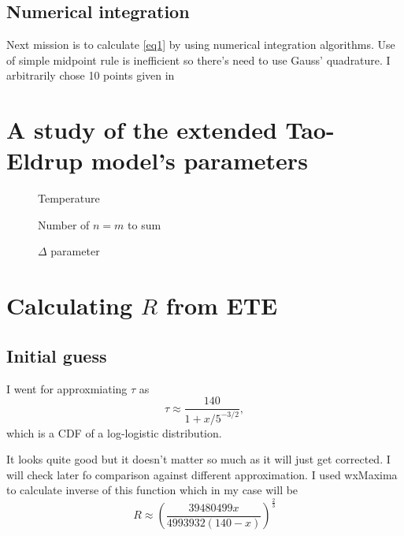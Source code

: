 \documentclass[a4paper]{article}
\begin{document}
	\subsection{Numerical integration}
	Next mission is to calculate \ref{eq1} by using numerical 
	integration algorithms.
	Use of simple midpoint rule is inefficient so there's need to use Gauss'
	quadrature. I arbitrarily chose 10 points given in \cite[table 3.5.2]{NIST:DLMF}
	\section{A study of the extended Tao-Eldrup model's parameters}
	\begin{figure}[!ht]
	\centering
	\scalebox{.9}{}
	\caption{Temperature}
	\end{figure}
	\begin{figure}[!ht]
	\centering
	\scalebox{.9}{}
	\caption{Number of $n = m$ to sum}
	\end{figure}
	\begin{figure}[!ht]
	\centering
	\scalebox{.9}{}
	\caption{$\Delta$ parameter}
	\end{figure}
	\section{Calculating $R$ from ETE}
	\subsection{Initial guess}
	I went for approxmiating $\tau$ as 
	\begin{equation}
		\tau \approx \frac{140}{1+x/5^{-3/2}},
	\end{equation}
	which is a CDF of a log-logistic distribution.

	It looks quite good but it doesn't matter so much as
	it will just get corrected.
	I will check later fo comparison against different approximation.
	I used wxMaxima to calculate inverse of this function which in my case
	will be 
	\begin{equation}
		R \approx \left(\frac{39480499x}{4993932(140-x)}\right)^{\textstyle\frac{2}{3}}
	\end{equation}
	
	
\end{document}
